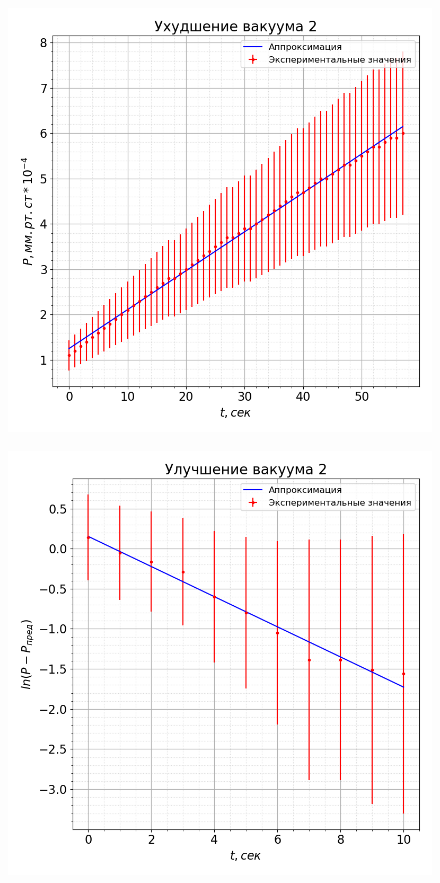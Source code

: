 \documentclass[a4paper,12pt]{article}
\begin{document}
\begin{enumerate}
        \begin{figure}[h!]
            \centering
            \begin{minipage}{0.45\textwidth}
                \centering
                \includegraphics[width=1\linewidth]{img/rise2.png}
                \label{rise2}
            \end{minipage}
            \begin{minipage}{0.45\textwidth}
                \centering
                \includegraphics[width=1\linewidth]{img/fall2.png}
                \label{fall2}
            \end{minipage}
        \end{figure}


\end{enumerate}
\end{document}
